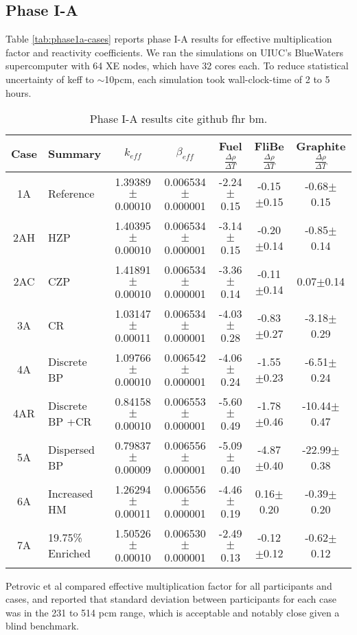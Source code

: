 \subsection{Phase I-A}
Table \ref{tab:phase1a-cases} reports phase I-A results for effective multiplication 
factor and reactivity coefficients. 
We ran the simulations on \gls{UIUC}'s BlueWaters supercomputer with 64 XE nodes, 
which have 32 cores each. 
To reduce statistical uncertainty of keff to $\sim$10pcm, each simulation took 
wall-clock-time of 2 to 5 hours. 
\begin{table}[H]
    \centering
    \onehalfspacing
    \caption{Phase I-A results cite github fhr bm.}
	\label{tab:phase1a-results}
    \footnotesize
    \begin{tabular}{cp{2.6cm}ccccc}
    \hline
    \textbf{Case} & \textbf{Summary} &\textbf{$k_{eff}$} & 
    \textbf{$\beta_{eff}$} & 
    \textbf{Fuel} $\frac{\Delta \rho}{\Delta T}$ & 
    \textbf{FliBe} $\frac{\Delta \rho}{\Delta T}$ & 
    \textbf{Graphite} $\frac{\Delta \rho}{\Delta T}$\\
    \hline 
    1A & Reference &1.39389$\pm$0.00010 & 0.006534$\pm$0.000001 & -2.24$\pm$0.15 & -0.15$\pm$0.15 & -0.68$\pm$0.15\\
    2AH & \gls{HZP} &1.40395$\pm$0.00010 & 0.006534$\pm$0.000001 & -3.14$\pm$0.15 & -0.20$\pm$0.14 & -0.85$\pm$0.14\\
    2AC & \gls{CZP} &1.41891$\pm$0.00010 & 0.006534$\pm$0.000001 & -3.36$\pm$0.14 & -0.11$\pm$0.14 & 0.07$\pm$0.14\\
    3A & \gls{CR} &1.03147$\pm$0.00011 & 0.006534$\pm$0.000001 & -4.03$\pm$0.28 & -0.83$\pm$0.27 & -3.18$\pm$0.29\\
    4A & Discrete \gls{BP} &1.09766$\pm$0.00010 & 0.006542$\pm$0.000001 & -4.06$\pm$0.24 & -1.55$\pm$0.23 & -6.51$\pm$0.24\\
    4AR & Discrete \gls{BP} +\gls{CR} &0.84158$\pm$0.00010 & 0.006553$\pm$0.000001 & -5.60$\pm$0.49 & -1.78$\pm$0.46 & -10.44$\pm$0.47\\
    5A & Dispersed \gls{BP} &0.79837$\pm$0.00009 & 0.006556$\pm$0.000001 & -5.09$\pm$0.40 & -4.87$\pm$0.40 & -22.99$\pm$0.38\\
    6A & Increased \gls{HM} &1.26294$\pm$0.00011 & 0.006556$\pm$0.000001 & -4.46$\pm$0.19 & 0.16$\pm$0.20 & -0.39$\pm$0.20\\
    7A & 19.75\% Enriched &1.50526$\pm$0.00010 & 0.006530$\pm$0.000001 & -2.49$\pm$0.13 & -0.12$\pm$0.12 & -0.62$\pm$0.12\\
    \hline
    \end{tabular}
\end{table}
Petrovic et al compared effective multiplication factor for all participants 
and cases, and reported that standard deviation between participants for each case 
was in the 231 to 514 pcm range, which is acceptable and notably close given a 
blind benchmark. 

